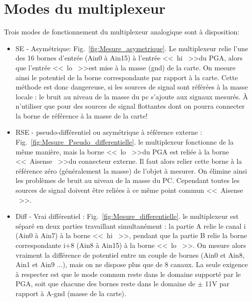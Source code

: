 \section{Modes du multiplexeur}

Trois modes de fonctionnement du multiplexeur analogique sont à disposition:

\begin{itemize}
    \item SE - Asymétrique: Fig.~\ref{fig:Mesure_asymetrique}. Le multiplexeur relie l'une des 16 bornes d'entrée (Ain0 à Ain15) à l'entrée \textless\textless\ hi \ \textgreater\textgreater du PGA, alors que l'entrée \textless\textless\ lo \ \textgreater\textgreater est mise à la masse (gnd) de la carte. On mesure ainsi le potentiel de la borne correspondante par rapport  à la carte. Cette méthode est donc dangereuse, si les sources de signal sont référées à la masse locale : le bruit au niveau de la masse du pc s'ajoute aux signaux mesurés. À n'utiliser que pour des sources de signal flottantes dont on pourra connecter la borne de référence à la masse de la carte!
    \item RSE - pseudo-différentiel ou asymétrique à référence externe : Fig.~\ref{fig:Mesure_Pseudo_differentielle}. le multiplexeur fonctionne de la même manière, mais la borne \textless\textless\ lo \ \textgreater\textgreater du PGA est reliée à la borne \textless\textless\ Aisense \ \textgreater\textgreater du connecteur externe. Il faut alors relier cette borne à la référence zéro (généralement la masse) de l'objet à mesurer. On élimine ainsi les problèmes de bruit au niveau de la masse du PC. Cependant toutes les sources de signal doivent être reliées à ce même point commun \textless\textless\ Aisense \ \textgreater\textgreater.
    \item Diff - Vrai différentiel : Fig.~\ref{fig:Mesure_differentielle}. le multiplexeur est séparé en deux parties travaillant simultanément : la partie A relie le canal i (Ain0 à Ain7) à la borne \textless\textless\ hi \ \textgreater\textgreater, pendant que la partie B relie la borne correspondante i+8 (Ain8 à Ain15) à la borne \textless\textless\ lo \ \textgreater\textgreater. On mesure alors vraiment la différence de potentiel entre un couple de bornes (Ain0 et Ain8, Ain1 et Ain9 ...), mais on ne dispose plus que de 8 canaux. La seule exigence à respecter est que le mode commun reste dans le domaine supporté par le PGA, soit que chacune des bornes reste dans le domaine de $\pm$ 11V par rapport à A-gnd (masse de la carte).
\end{itemize}

